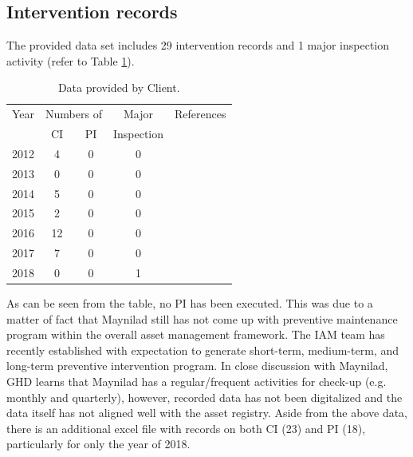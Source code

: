 \subsection{Intervention records}
\label{212}
The provided data set includes 29 intervention records and 1 major inspection activity (refer to Table \ref{noofintervention}).  

\begin{table}[h]
	\caption{Data provided by Client.}
	\label{noofintervention}
	{\footnotesize
\begin{tabular}{l|l|l|l|p{6cm}}
	\hline
	\multicolumn{1}{c|}{Year} & \multicolumn{2}{c|}{Numbers of} & \multicolumn{1}{c|}{Major} & References \\ 
	\cline{2-3}
	\multicolumn{1}{c|}{} & \multicolumn{1}{c|}{CI} & \multicolumn{1}{c|}{PI} & \multicolumn{1}{c|}{Inspection} &  \\ 
	\hline
	\multicolumn{1}{c|}{2012} & \multicolumn{1}{c|}{4} & \multicolumn{1}{c|}{0} & \multicolumn{1}{c|}{0} & \cite{Maynilad2012a, Maynilad2012b, Maynilad2012, Maynilad2012c} \\ 
	\multicolumn{1}{c|}{2013} & \multicolumn{1}{c|}{0} & \multicolumn{1}{c|}{0} & \multicolumn{1}{c|}{0} &  \\ 
	\multicolumn{1}{c|}{2014} & \multicolumn{1}{c|}{5} & \multicolumn{1}{c|}{0} & \multicolumn{1}{c|}{0} & \cite{Maynilad2014d,Maynilad2014b,Maynilad2014c,Maynilad2014a,Maynilad2014} \\ 
	\multicolumn{1}{c|}{2015} & \multicolumn{1}{c|}{2} & \multicolumn{1}{c|}{0} & \multicolumn{1}{c|}{0} & \cite{Maynilad2015, Maynilad2015a} \\ 
	\multicolumn{1}{c|}{2016} & \multicolumn{1}{c|}{12} & \multicolumn{1}{c|}{0} & \multicolumn{1}{c|}{0} &  \cite{Maynilad2016, Maynilad2016a,Maynilad2016b, Maynilad2016c, Maynilad2016d, Maynilad2016e, Maynilad2016f, Maynilad2016g, Maynilad2016h, Maynilad2016i, Maynilad2016l, Maynilad2016m}\\ 
	\multicolumn{1}{c|}{2017} & \multicolumn{1}{c|}{7} & \multicolumn{1}{c|}{0} & \multicolumn{1}{c|}{0} & \cite{Maynilad2017, Maynilad2017a, Maynilad2017b, Maynilad2017c, Maynilad2017d, Maynilad2017e, Maynilad2017f} \\ 
	\multicolumn{1}{c|}{2018} & \multicolumn{1}{c|}{0} & \multicolumn{1}{c|}{0} & \multicolumn{1}{c|}{1} &  \\ 
	\hline
\end{tabular}
	}
\end{table}

As can be seen from the table, no PI has been executed. This was due to a matter of fact that Maynilad still has not come up with preventive maintenance program within the overall asset management framework. The IAM team has recently established with expectation to generate short-term, medium-term, and long-term preventive intervention program. In close discussion with Maynilad, GHD learns that Maynilad has a regular/frequent activities for check-up (e.g. monthly and quarterly), however, recorded data has not been digitalized and the data itself has not aligned well with the asset registry. Aside from the above data, there is an additional excel file with records on both CI (23) and PI (18), particularly for only the year of 2018. 

